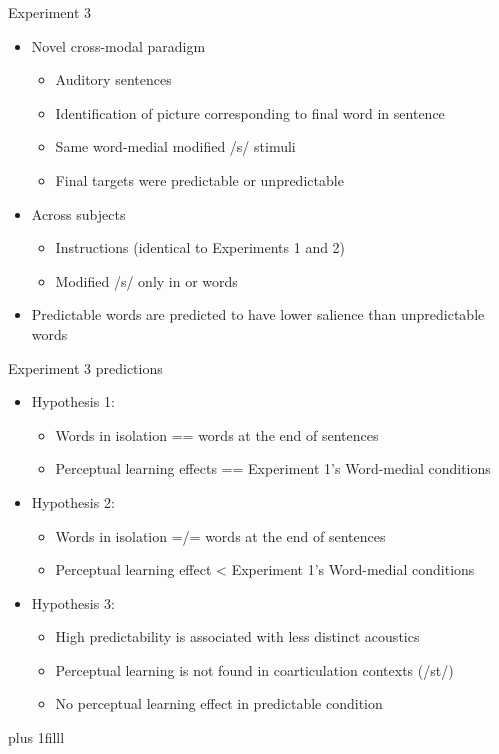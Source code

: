 \documentclass{beamer}
\newcommand{\btVFill}{\vskip0pt plus 1filll}
\begin{document}
\begin{frame}{Experiment 3}

\begin{itemize}
\item Novel cross-modal paradigm
\begin{itemize}
\item Auditory sentences
\item Identification of picture corresponding to final word in sentence
\item Same word-medial modified /s/ stimuli
\item Final targets were predictable or unpredictable
\end{itemize}
\item Across subjects
\begin{itemize}
\item Instructions (identical to Experiments 1 and 2)
\item Modified /s/ only in  or  words
\end{itemize}
\item Predictable words are predicted to have lower salience than unpredictable words
\end{itemize}

\end{frame}

\begin{frame}{Experiment 3 predictions}

\begin{itemize}
\item Hypothesis 1:
\begin{itemize}
\item Words in isolation == words at the end of sentences
\item Perceptual learning effects == Experiment 1's Word-medial conditions
\end{itemize}
\item Hypothesis 2:
\begin{itemize}
\item Words in isolation =/= words at the end of sentences
\item Perceptual learning effect < Experiment 1's Word-medial conditions
\end{itemize}
\item Hypothesis 3:
\begin{itemize}
\item High predictability is associated with less distinct acoustics
\item Perceptual learning is not found in coarticulation contexts (/st\textturnr/)
\item No perceptual learning effect in predictable condition
\end{itemize}
\end{itemize}
\btVFill
\begin{flushright}
\scriptsize
\citet{Clopper2008, Scarborough2010,Kraljic2008a}
\end{flushright}
\end{frame}
\end{document}
